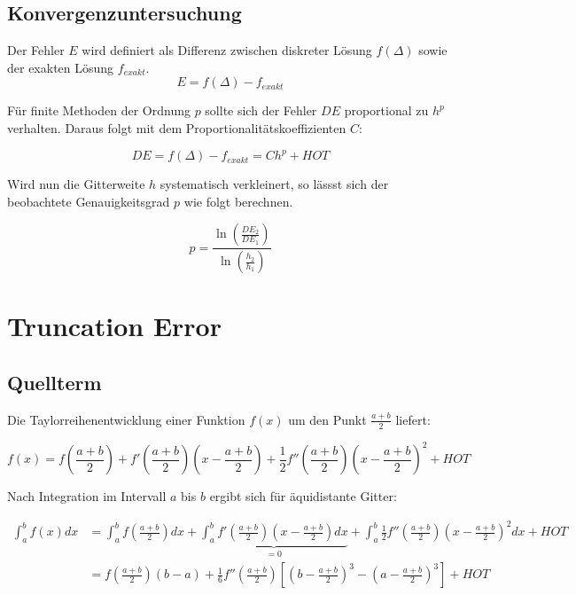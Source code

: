\documentclass[ngerman,colorback,accentcolor=tud2d]{tudreport}
\begin{document}
\section{Konvergenzuntersuchung}
\label{sec:Konvergenzuntersuchung}

Der Fehler $E$ wird definiert als Differenz zwischen diskreter Lösung $f(\Delta)$ sowie
der exakten Lösung $f_{exakt}$.
\begin{equation*}
  E=f(\Delta) - f_{exakt}
\end{equation*}

Für finite Methoden der Ordnung $p$ sollte sich der Fehler $DE$ proportional zu
$h^p$ verhalten. Daraus folgt mit dem Proportionalitätskoeffizienten $C$:

\begin{equation*}
  DE=f(\Delta) - f_{exakt}=C h^p + HOT
\end{equation*}

Wird nun die Gitterweite $h$ systematisch verkleinert, so lässst sich der beobachtete
Genauigkeitsgrad $p$ wie folgt berechnen.

\begin{equation}
  p=\frac{\ln \left(\frac{DE_2}{DE_1}\right)}{\ln \left(\frac{h_2}{h_1}\right)}
\end{equation}

\chapter{Truncation Error}
\label{cha:Truncation Error}

\newcommand{\ab}{\frac{a+b}{2}}
\newcommand{\abk}{\left(\frac{a+b}{2}\right)}

\section{Quellterm}
\label{sec:Quellterm}


Die Taylorreihenentwicklung einer Funktion $f(x)$ um den Punkt $\ab$
liefert:

\begin{equation*}
  f(x) = f\abk +
  f'\abk\left(x-\ab\right) +
  \frac{1}{2}f''\abk{\left(x-\ab\right)}^2 + HOT
\end{equation*}

Nach Integration im Intervall $a$ bis $b$ ergibt sich für äquidistante Gitter:

\begin{align*}
  \int_a^b f(x) dx &= \int_a^b f\abk dx +
  \underbrace{\int_a^b f'\abk \left( x - \ab\right) dx}_{=0} +
  \int_a^b \frac{1}{2}f''\abk{\left(x-\ab\right)}^2 dx + HOT\\
  &= f\abk (b-a) + \frac{1}{6} f''\abk
  \left[\left( b-\ab \right)^3 - \left(a-\ab\right)^3 \right] + HOT
\end{align*}
\end{document}
